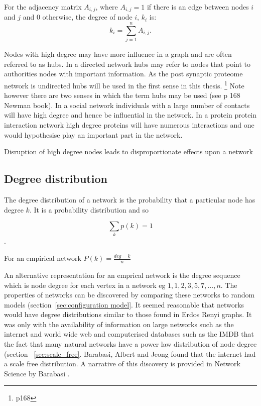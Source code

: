 For the adjacency matrix $A_{i,j}$, where $A_{i,j}=1$  if there is an edge between nodes $i$ and $j$ and 0 otherwise, the degree of node $i$, $k_i$ is\cite{boccaletti2006complex}:
\begin{equation}
k_i = \sum_{j=1}^n A_{i,j}.
\label{Equation:Degree_from_adjacency}
\end{equation}

 Nodes with high degree may have more influence in a graph and are often referred to as hubs. In a directed network hubs may refer to nodes that point to authorities nodes with important information. As the post synaptic proteome network is undirected hubs will be used in the first sense in this thesis. \cite{kleinberg1999authoritative} \footnote{\cite{newman2018networks} p168} Note however there are two senses in which the term hubs may be used (see p 168 Newman book\cite{newman2018networks}).  In a social network  individuals with a large number of contacts will have high degree and hence be influential in the network. In a protein protein interaction network high degree proteins will have numerous interactions and one would hypothesise play an important part in the network. 
 
 Disruption of high degree nodes leads to disproportionate effects upon a network \cite{jeong2001lethality} \cite{albert2000error} 

\subsection{Degree distribution}
\label{sec:degree distribution}
The degree distribution of a network is the probability that a particular node has degree $k$. It is a probability distribution and so

\begin{equation}
    \sum_k p(k)=1
\end{equation}.

For an empirical network $P(k) = \frac{deg=k}{n}$

An alternative representation for an emprical network is the degree sequence which is  node degree for each vertex in a network eg $1,1,2,3,5,7,\dots,n$. The properties of networks can be discovered by comparing these networks to random models (section~\ref{sec:configuration model}. It seemed reasonable that networks would have degree distributions similar to those found in Erdos Renyi graphs. It was only with the availability of information on large networks such as the internet and world wide web and computerised databases such as the IMDB that the fact that many natural networks have a power law distribution of node degree (section ~\ref{sec:scale_free}. Barabasi, Albert and Jeong found that the internet had a scale free distribution. A narrative of this discovery is provided in Network Science by Barabasi \cite{barabasi2016network}. 


